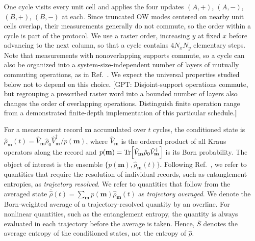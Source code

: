 \documentclass[aps,prb,10pt,twocolumn,superscriptaddress,longbibliography,floatfix]{revtex4-2}
\newcommand{\rec}{\mathbf m}   %
\newcommand{\GPT}[1]{{\color{magenta}[GPT: #1]}}
\begin{document}
One cycle visits every unit cell and applies the four updates $(A,+)$, $(A,-)$, $(B,+)$, $(B,-)$ at each. Since truncated OW modes centered on nearby unit cells overlap, their measurements generally do not commute, so the order within a cycle is part of the protocol. We use a raster order, increasing $y$ at fixed $x$ before advancing to the next column, so that a cycle contains $4N_xN_y$ elementary steps. Note that measurements with nonoverlapping supports commute, so a cycle can also be organized into a system-size-independent number of layers of mutually commuting operations, as in Ref.~\cite{BhuiyanPanJian2026}. We expect the universal properties studied below not to depend on this choice.
\GPT{Disjoint-support operations commute, but regrouping a prescribed raster word into a bounded number of layers also changes the order of overlapping operations. Distinguish finite operation range from a demonstrated finite-depth implementation of this particular schedule.}


For a measurement record $\rec$ accumulated over $t$ cycles, the conditioned state is $\hat\rho_{\rec}(t)=\hat V_{\rec}\hat\rho_0\hat V_{\rec}^\dagger/p(\rec)$, where $\hat V_{\rec}$ is the ordered product of all Kraus operators along the record and $p(\rec)=\Tr[\hat V_{\rec}\hat\rho_0\hat V_{\rec}^\dagger]$ is its Born probability. The object of interest is the ensemble $\{p(\rec),\hat\rho_{\rec}(t)\}$. Following Ref.~\cite{BhuiyanPanJian2026}, we refer to quantities that require the resolution of individual records, such as entanglement entropies, as \emph{trajectory resolved}. We refer to quantities that follow from the averaged state $\overline{\hat\rho}(t)=\sum_{\rec}p(\rec)\hat\rho_{\rec}(t)$ as \emph{trajectory averaged}. We denote the Born-weighted average of a trajectory-resolved quantity by an overline. For nonlinear quantities, such as the entanglement entropy, the quantity is always evaluated in each trajectory before the average is taken. Hence, $\overline{S}$ denotes the average entropy of the conditioned states, not the entropy of $\overline{\hat\rho}$.
\end{document}
